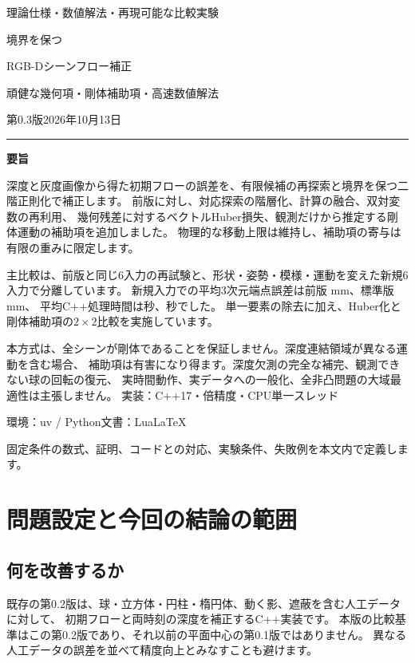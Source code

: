 \documentclass[a4paper,11pt]{ltjsarticle}
\theoremstyle{definition}
\begin{document}
\hypersetup{pageanchor=false}
\begin{titlepage}
\vspace*{10mm}
{\sffamily\large 理論仕様・数値解法・再現可能な比較実験}\par\vspace{10mm}
{\sffamily\huge 境界を保つ\par RGB-Dシーンフロー補正}\par\vspace{5mm}
{\sffamily\Large 頑健な幾何項・剛体補助項・高速数値解法}\par\vspace{9mm}
第0.3版\quad 2026年10月13日\par\vspace{8mm}
\hrule\vspace{6mm}
\textbf{要旨}\par
深度と灰度画像から得た初期フローの誤差を、有限候補の再探索と境界を保つ二階正則化で補正します。
前版に対し、対応探索の階層化、計算の融合、双対変数の再利用、
幾何残差に対するベクトルHuber損失、観測だけから推定する剛体運動の補助項を追加しました。
物理的な移動上限は維持し、補助項の寄与は有限の重みに限定します。

主比較は、前版と同じ6入力の再試験と、形状・姿勢・模様・運動を変えた新規6入力で分離しています。
新規入力での平均3次元端点誤差は前版\HeldOld{} mm、標準版\HeldNew{} mm、
平均C++処理時間は\HeldTimeOld{}秒、\HeldTimeNew{}秒でした。
単一要素の除去に加え、Huber化と剛体補助項の$2\times2$比較を実施しています。

本方式は、全シーンが剛体であることを保証しません。深度連結領域が異なる運動を含む場合、
補助項は有害になり得ます。深度欠測の完全な補完、観測できない球の回転の復元、
実時間動作、実データへの一般化、全非凸問題の大域最適性は主張しません。
\vfill
\small
実装：C++17・倍精度・CPU単一スレッド\par
環境：uv / Python\quad 文書：LuaLaTeX\par
固定条件の数式、証明、コードとの対応、実験条件、失敗例を本文内で定義します。
\end{titlepage}
\hypersetup{pageanchor=true}
\setcounter{tocdepth}{2}\tableofcontents\clearpage{}

\section{問題設定と今回の結論の範囲}
\subsection{何を改善するか}
既存の第0.2版は、球・立方体・円柱・楕円体、動く影、遮蔽を含む人工データに対して、
初期フローと両時刻の深度を補正するC++実装です。
本版の比較基準はこの第0.2版であり、それ以前の平面中心の第0.1版ではありません。
異なる人工データの誤差を並べて精度向上とみなすことも避けます。
\end{document}
